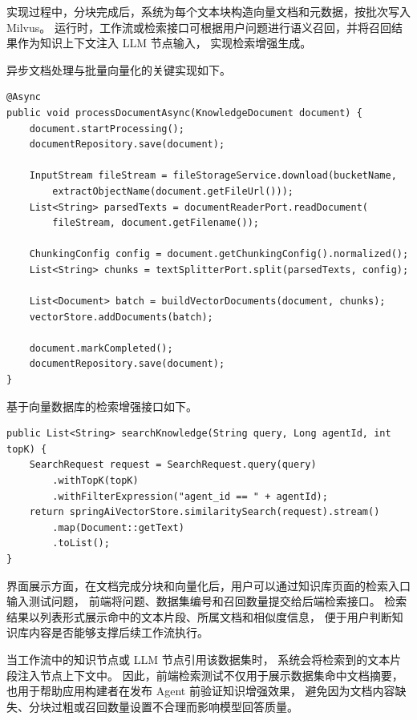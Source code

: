 实现过程中，分块完成后，系统为每个文本块构造向量文档和元数据，按批次写入 Milvus。
运行时，工作流或检索接口可根据用户问题进行语义召回，并将召回结果作为知识上下文注入 LLM 节点输入，
实现检索增强生成。


异步文档处理与批量向量化的关键实现如下。

\begin{lstlisting}[style=java, caption={AsyncDocumentProcessor 文档分块与向量化处理}]
@Async
public void processDocumentAsync(KnowledgeDocument document) {
    document.startProcessing();
    documentRepository.save(document);

    InputStream fileStream = fileStorageService.download(bucketName,
        extractObjectName(document.getFileUrl()));
    List<String> parsedTexts = documentReaderPort.readDocument(
        fileStream, document.getFilename());

    ChunkingConfig config = document.getChunkingConfig().normalized();
    List<String> chunks = textSplitterPort.split(parsedTexts, config);

    List<Document> batch = buildVectorDocuments(document, chunks);
    vectorStore.addDocuments(batch);

    document.markCompleted();
    documentRepository.save(document);
}
\end{lstlisting}

基于向量数据库的检索增强接口如下。

\begin{lstlisting}[style=java, caption={MilvusVectorStoreAdapter 知识检索接口}]
public List<String> searchKnowledge(String query, Long agentId, int topK) {
    SearchRequest request = SearchRequest.query(query)
        .withTopK(topK)
        .withFilterExpression("agent_id == " + agentId);
    return springAiVectorStore.similaritySearch(request).stream()
        .map(Document::getText)
        .toList();
}
\end{lstlisting}


界面展示方面，在文档完成分块和向量化后，用户可以通过知识库页面的检索入口输入测试问题，
前端将问题、数据集编号和召回数量提交给后端检索接口。
检索结果以列表形式展示命中的文本片段、所属文档和相似度信息，
便于用户判断知识库内容是否能够支撑后续工作流执行。

当工作流中的知识节点或 LLM 节点引用该数据集时，
系统会将检索到的文本片段注入节点上下文中。
因此，前端检索测试不仅用于展示数据集命中文档摘要，
也用于帮助应用构建者在发布 Agent 前验证知识增强效果，
避免因为文档内容缺失、分块过粗或召回数量设置不合理而影响模型回答质量。


